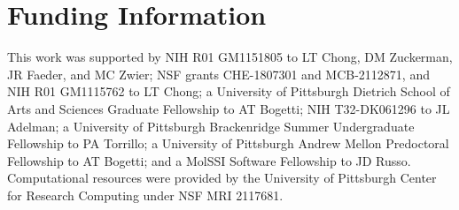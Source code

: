 \section{Funding Information}

This work was supported by NIH R01 GM1151805 to LT Chong, DM Zuckerman, JR Faeder, and MC Zwier; NSF grants CHE-1807301 and MCB-2112871, and NIH R01 GM1115762 to LT Chong; a University of Pittsburgh Dietrich School of Arts and Sciences Graduate Fellowship to AT Bogetti; NIH T32-DK061296 to JL Adelman; a University of Pittsburgh Brackenridge Summer Undergraduate Fellowship to PA Torrillo; a University of Pittsburgh Andrew Mellon Predoctoral Fellowship to AT Bogetti; and a MolSSI Software Fellowship to JD Russo. Computational resources were provided by the University of Pittsburgh Center for Research Computing under NSF MRI 2117681.

